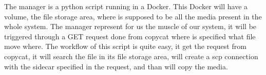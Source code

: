 The manager is a python script running in a Docker. This Docker will have a volume, the file storage area, where is supposed to be all the media present in the whole system. The manager represent for us the muscle of our system, it will be triggered through a G\+ET request done from copycat where is specified what file move where. The workflow of this script is quite easy, it get the request from copycat, it will search the file in its file storage area, will create a scp connection with the sidecar specified in the request, and than will copy the media. 